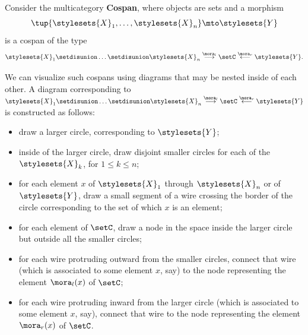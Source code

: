 


\begin{gradedexercise}
    \label{ex:HwkCospanMulticat}

    Consider the multicategory \textbf{Cospan}, where objects are sets and a morphism
    \begin{equation}
        \tup{\stylesets{X}_1, \dots, \stylesets{X}_n} \mto \stylesets{Y}
    \end{equation}
    is a cospan of the type
    \begin{equation}
        \stylesets{X}_1 \setdisunion \dots \setdisunion \stylesets{X}_n \overset{\mora_l}{\longrightarrow} \setC \overset{\mora_r}{\longleftarrow} \stylesets{Y}.
    \end{equation}

    We can visualize such cospans using diagrams that may be nested inside of each other.
    A diagram corresponding to $\stylesets{X}_1 \setdisunion \dots \setdisunion \stylesets{X}_n \overset{\mora_l}{\longrightarrow} \setC \overset{\mora_r}{\longleftarrow} \stylesets{Y}$ is constructed as follows:
    \begin{itemize}
        \item draw a larger circle, corresponding to $\stylesets{Y}$;
        \item inside of the larger circle, draw disjoint smaller circles for each of the $\stylesets{X}_k$, for $1 \leq k \leq n$;
        \item for each element $x$ of $\stylesets{X}_1$ through $\stylesets{X}_n$ or of $\stylesets{Y}$, draw a small segment of a wire crossing the border of the circle corresponding to the set of which $x$ is an element;
        \item for each element of $\setC$, draw a node in the space inside the larger circle but outside all the smaller circles;
        \item for each wire protruding outward from the smaller circles, connect that wire (which is associated to some element $x$, say) to the node representing the element $\mora_l(x)$ of $\setC$;
        \item for each wire protruding inward from the larger circle (which is associated to some element $x$, say), connect that wire to the node representing the element $\mora_r(x)$ of $\setC$.
    \end{itemize}


\end{gradedexercise}
